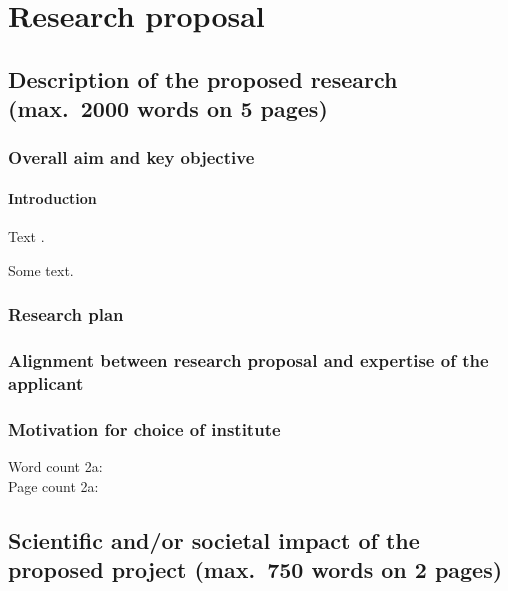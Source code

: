 \section{Research proposal}\label{sec:proposal}

\subsection{Description of the proposed research (max.~2000 words on 5 pages)}\label{sec:research}
\countem

\subsubsection{Overall aim and key objective}\label{sec:aim}

\paragraph{Introduction}\label{sec:intro}

Text \cite{clarke2018}.

\begin{mdframed}
    Some text.
\end{mdframed}

\subsubsection{Research plan}\label{sec:plan}

\subsubsection{Alignment between research proposal and expertise of the applicant}

\subsubsection{Motivation for choice of institute}\label{sec:institute}


\endcountem
\addtocounter{wordcount}{-30}  %
\vspace{2em}
Word count 2a:     \thewordcount{}\\
Page count 2a:     \\


\newpage
\subsection{Scientific and/or societal impact of the proposed project (max.~750 words on 2 pages)}\label{sec:KU}

